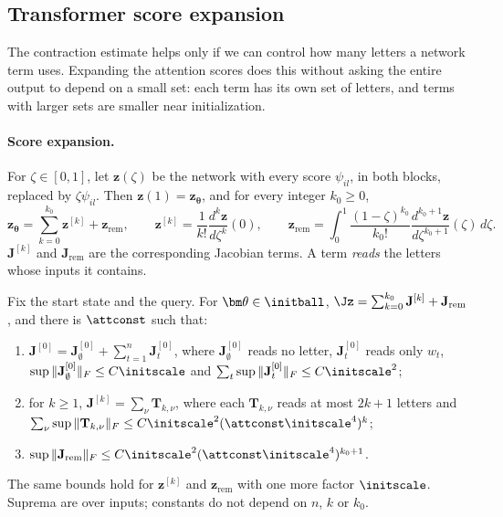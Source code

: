 \subsection{Transformer score expansion}
\label{app:model-spectrum}

The contraction estimate helps only if we can control how many letters a network term uses. Expanding the attention scores does
this without asking the entire output to depend on a small set: each term has its own set of letters, and terms with larger sets
are smaller near initialization.

\paragraph{Score expansion.} For $\zeta\in[0,1]$, let $\bm z(\zeta)$ be the network with every score $\psi_{il}$, in both blocks, replaced by
$\zeta\psi_{il}$. Then $\bm z(1)=\bm z_{\bm\theta}$, and for every integer $k_0\ge0$,
\begin{equation}
 \bm z_{\bm\theta}=\sum_{k=0}^{k_0}\bm z^{[k]}+\bm z_{\mathrm{rem}},\qquad
 \bm z^{[k]}=\frac{1}{k!}\frac{d^k\bm z}{d\zeta^k}(0),\qquad
 \bm z_{\mathrm{rem}}=\int_0^1\frac{(1-\zeta)^{k_0}}{k_0!}\frac{d^{k_0+1}\bm z}{d\zeta^{k_0+1}}(\zeta)\,d\zeta .
 \label{eq:score-split}
\end{equation}
$\mathbf J^{[k]}$ and $\mathbf J_{\mathrm{rem}}$ are the corresponding Jacobian terms. A term \emph{reads} the letters whose inputs it contains.

\begin{proposition}
\label{prop:score-degree}
Fix the start state and the query. For $\bm\theta\in\initball$, $\Jz=\sum_{k=0}^{k_0}\mathbf J^{[k]}+\mathbf J_{\mathrm{rem}}$, and there is $\attconst$ such that:
\begin{enumerate}[label=(\roman*),leftmargin=*,itemsep=2pt,topsep=2pt]
\item $\mathbf J^{[0]}=\mathbf J^{[0]}_\emptyset+\sum_{t=1}^n\mathbf J^{[0]}_t$, where $\mathbf J^{[0]}_\emptyset$ reads no letter, $\mathbf J^{[0]}_t$ reads only $w_t$, $\sup\|\mathbf J^{[0]}_\emptyset\|_F\le C\initscale$ and
$\sum_t\sup\|\mathbf J^{[0]}_t\|_F\le C\initscale^2$;
\item for $k\ge1$, $\mathbf J^{[k]}=\sum_\nu\mathbf T_{k,\nu}$, where each $\mathbf T_{k,\nu}$ reads at most $2k+1$ letters and $\sum_\nu\sup\|\mathbf T_{k,\nu}\|_F\le C\initscale^2(\attconst\initscale^4)^k$;
\item $\sup\|\mathbf J_{\mathrm{rem}}\|_F\le C\initscale^2(\attconst\initscale^4)^{k_0+1}$.
\end{enumerate}
The same bounds hold for $\bm z^{[k]}$ and $\bm z_{\mathrm{rem}}$ with one more factor $\initscale$. Suprema are over inputs; constants do not depend on
$n$, $k$ or $k_0$.
\end{proposition}

